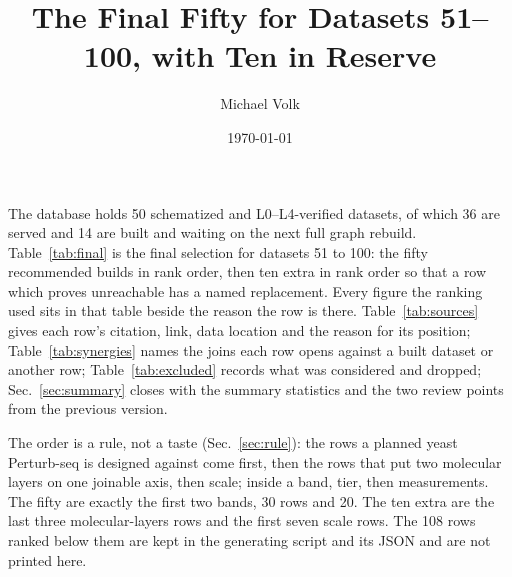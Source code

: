 \documentclass[10pt,a4paper]{article}
\title{\vspace{-1.5em}The Final Fifty for Datasets 51--100, with Ten in Reserve}
\author{Michael Volk}
\date{\today}
\begin{document}
\maketitle
\thispagestyle{empty}

\noindent
The database holds 50 schematized and L0--L4-verified 
datasets, of which 36 are served and 14 are built and waiting on the next full graph
rebuild. Table~\ref{tab:final} is the final selection for datasets 51 to 100: the fifty
recommended builds in rank order, then ten extra in rank order so that a row which proves
unreachable has a named replacement. Every figure the ranking used sits in that table
beside the reason the row is there. Table~\ref{tab:sources} gives each row's citation, link,
data location and the reason for its position; Table~\ref{tab:synergies} names the joins
each row opens against a built dataset or another row; Table~\ref{tab:excluded} records
what was considered and dropped; Sec.~\ref{sec:summary} closes with the summary
statistics and the two review points from the previous version.

The order is a rule, not a taste (Sec.~\ref{sec:rule}): the rows a planned yeast
Perturb-seq is designed against come first, then the rows that put two molecular layers on
one joinable axis, then scale; inside a band, tier, then measurements. The fifty are exactly
the first two bands, 30 rows and 20. The ten extra are the last three molecular-layers rows
and the first seven scale rows. The 108 rows ranked below them are kept in the generating
script and its JSON and are not printed here.

\vspace{0.5em}
\tccontents
\clearpage






\end{document}
